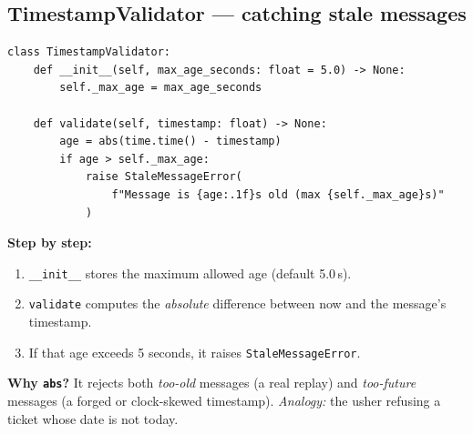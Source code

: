 \documentclass[11pt,a4paper]{article}
\begin{document}
\subsection{TimestampValidator --- catching stale messages}
\begin{lstlisting}[style=py,caption={auth\_protocol.py --- the timestamp validator.}]
class TimestampValidator:
    def __init__(self, max_age_seconds: float = 5.0) -> None:
        self._max_age = max_age_seconds

    def validate(self, timestamp: float) -> None:
        age = abs(time.time() - timestamp)
        if age > self._max_age:
            raise StaleMessageError(
                f"Message is {age:.1f}s old (max {self._max_age}s)"
            )
\end{lstlisting}
\textbf{Step by step:}
\begin{enumerate}
  \item \texttt{\_\_init\_\_} stores the maximum allowed age (default 5.0\,s).
  \item \texttt{validate} computes the \emph{absolute} difference between now and
        the message's timestamp.
  \item If that age exceeds 5 seconds, it raises \texttt{StaleMessageError}.
\end{enumerate}
\textbf{Why \texttt{abs}?} It rejects both \emph{too-old} messages (a real replay)
and \emph{too-future} messages (a forged or clock-skewed timestamp).
\emph{Analogy:} the usher refusing a ticket whose date is not today.
\end{document}
